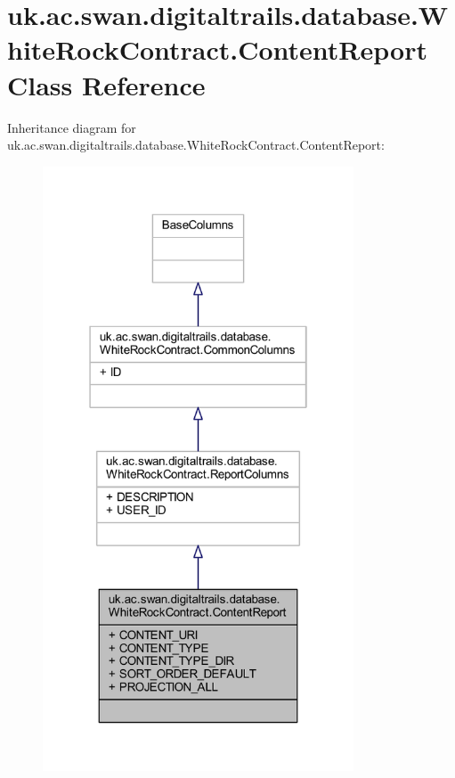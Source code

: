 \hypertarget{classuk_1_1ac_1_1swan_1_1digitaltrails_1_1database_1_1_white_rock_contract_1_1_content_report}{\section{uk.\+ac.\+swan.\+digitaltrails.\+database.\+White\+Rock\+Contract.\+Content\+Report Class Reference}
\label{classuk_1_1ac_1_1swan_1_1digitaltrails_1_1database_1_1_white_rock_contract_1_1_content_report}
}


Inheritance diagram for uk.\+ac.\+swan.\+digitaltrails.\+database.\+White\+Rock\+Contract.\+Content\+Report\+:
\nopagebreak
\begin{figure}[H]
\begin{center}
\leavevmode
\includegraphics[width=262pt]{classuk_1_1ac_1_1swan_1_1digitaltrails_1_1database_1_1_white_rock_contract_1_1_content_report__inherit__graph}
\end{center}
\end{figure}


